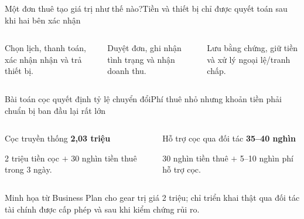 \begin{frame}{Một đơn thuê tạo giá trị như thế nào?}{Tiền và thiết bị chỉ được quyết toán sau khi hai bên xác nhận}
  \vspace{.9em}
  \centering
  \vfill
  \begin{columns}[T,onlytextwidth]
      \par\vspace{.35em}
      Chọn lịch, thanh toán, xác nhận nhận và trả thiết bị.
      \par\vspace{.35em}
      Duyệt đơn, ghi nhận tình trạng và nhận doanh thu.
      \par\vspace{.35em}
      Lưu bằng chứng, giữ tiền và xử lý ngoại lệ/tranh chấp.
  \end{columns}
\end{frame}

\begin{frame}{Bài toán cọc quyết định tỷ lệ chuyển đổi}{Phí thuê nhỏ nhưng khoản tiền phải chuẩn bị ban đầu lại rất lớn}
  \vspace{.4em}
  \begin{columns}[T,onlytextwidth]
      \begin{block}{Cọc truyền thống}
        \centering
        {\fontsize{25}{28}\selectfont\color{mutuxBlue}\bfseries 2,03 triệu}\par
        \vspace{.35em}
        2 triệu tiền cọc $+$ 30 nghìn tiền thuê trong 3 ngày.
      \end{block}
      \begin{exampleblock}{Hỗ trợ cọc qua đối tác}
        \centering
        {\fontsize{25}{28}\selectfont\color{mutuxTeal}\bfseries 35--40 nghìn}\par
        \vspace{.35em}
        30 nghìn tiền thuê $+$ 5--10 nghìn phí hỗ trợ cọc.
      \end{exampleblock}
  \end{columns}
  \vfill
  \centering\small\color{cookieMuted}
  Minh họa từ Business Plan cho gear trị giá 2 triệu; chỉ triển khai thật qua đối tác tài chính được cấp phép và sau khi kiểm chứng rủi ro.
\end{frame}

